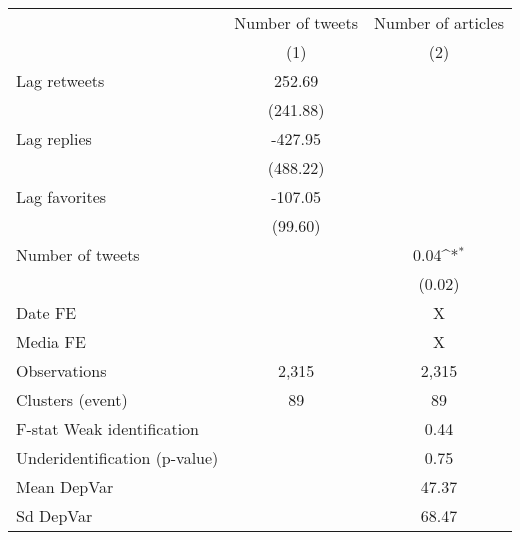 {
\def\sym#1{\ifmmode^{#1}\else\(^{#1}\)\fi}
\begin{tabular}{l*{2}{c}}
\hline\hline
                    &\multicolumn{1}{c}{Number of tweets}&\multicolumn{1}{c}{Number of articles}\\\cmidrule(lr){2-2}\cmidrule(lr){3-3}
                    &\multicolumn{1}{c}{(1)}         &\multicolumn{1}{c}{(2)}         \\
\hline
Lag retweets        &      252.69         &                     \\
                    &    (241.88)         &                     \\
Lag replies         &     -427.95         &                     \\
                    &    (488.22)         &                     \\
Lag favorites       &     -107.05         &                     \\
                    &     (99.60)         &                     \\
Number of tweets    &                     &        0.04\sym{*}  \\
                    &                     &      (0.02)         \\
\hline
Date FE             &                     &           X         \\
Media FE            &                     &           X         \\
Observations        &       2,315         &       2,315         \\
Clusters (event)    &          89         &          89         \\
F-stat Weak identification&                     &        0.44         \\
Underidentification (p-value)&                     &        0.75         \\
Mean DepVar         &                     &       47.37         \\
Sd DepVar           &                     &       68.47         \\
\hline\hline
\end{tabular}
}
